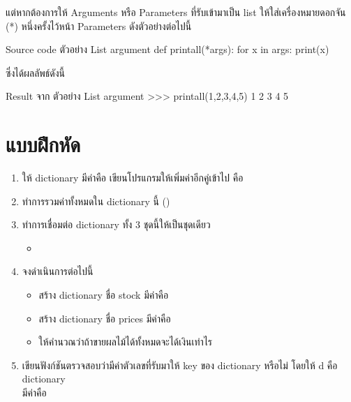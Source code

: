 แต่หากต้องการให้ Arguments หรือ Parameters ที่รับเข้ามาเป็น list ให้ใส่เครื่องหมายดอกจัน (*) หนึ่งครั้งไว้หน้า Parameters ดังตัวอย่างต่อไปนี้

\begin{codelist}{Source code ตัวอย่าง List argument}{}
def printall(*args):
    for x in args:
        print(x)
\end{codelist}

ซึ่งได้ผลลัพธ์ดังนี้
\begin{codelist}{Result จาก ตัวอย่าง List argument}{}
>>> printall(1,2,3,4,5)
1
2
3
4
5
\end{codelist}

\section{แบบฝึกหัด}

\begin{enumerate} 
\item ให้ dictionary มีค่าคือ  เขียนโปรแกรมให้เพิ่มค่าอีกคู่เข้าไป คือ 
\item ทำการรวมค่าทั้งหมดใน dictionary นี้ ()
\item ทำการเชื่อมต่อ dictionary ทั้ง 3 ชุดนี้ให้เป็นชุดเดียว
	\begin{itemize}
		\item {}
	\end{itemize}
\item จงดำเนินการต่อไปนี้
	\begin{itemize}
		\item สร้าง dictionary ชื่อ stock มีค่าคือ \\
		\item สร้าง dictionary ชื่อ prices มีค่าคือ \\
		\item ให้คำนวณว่าถ้าขายผลไม้ได้ทั้งหมดจะได้เงินเท่าไร
	\end{itemize}
\item เขียนฟังก์ชันตรวจสอบว่ามีค่าตัวเลขที่รับมาให้ key ของ dictionary หรือไม่ โดยให้ d คือ dictionary \\
มีค่าคือ 

\end{enumerate}
